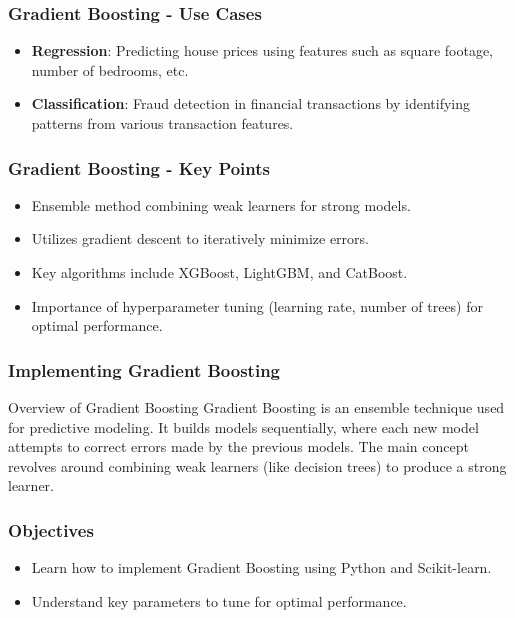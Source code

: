 \documentclass[aspectratio=169]{beamer}
\begin{document}
\begin{frame}[fragile]
    \frametitle{Gradient Boosting - Use Cases}
    \begin{itemize}
        \item \textbf{Regression}: Predicting house prices using features such as square footage, number of bedrooms, etc.
        \item \textbf{Classification}: Fraud detection in financial transactions by identifying patterns from various transaction features.
    \end{itemize}
\end{frame}

\begin{frame}[fragile]
    \frametitle{Gradient Boosting - Key Points}
    \begin{itemize}
        \item Ensemble method combining weak learners for strong models.
        \item Utilizes gradient descent to iteratively minimize errors.
        \item Key algorithms include XGBoost, LightGBM, and CatBoost.
        \item Importance of hyperparameter tuning (learning rate, number of trees) for optimal performance.
    \end{itemize}
\end{frame}

\begin{frame}
    \frametitle{Implementing Gradient Boosting}
    \begin{block}{Overview of Gradient Boosting}
        Gradient Boosting is an ensemble technique used for predictive modeling. It builds models sequentially, where each new model attempts to correct errors made by the previous models. The main concept revolves around combining weak learners (like decision trees) to produce a strong learner.
    \end{block}
\end{frame}

\begin{frame}
    \frametitle{Objectives}
    \begin{itemize}
        \item Learn how to implement Gradient Boosting using Python and Scikit-learn.
        \item Understand key parameters to tune for optimal performance.
    \end{itemize}
\end{frame}
\end{document}
